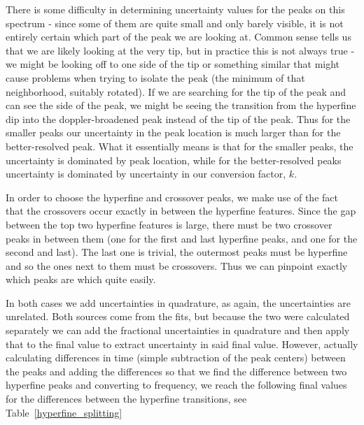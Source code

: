 \documentclass{article}
\begin{document}
  There is some difficulty in determining uncertainty values for the peaks on this spectrum - since some of them are quite small and only barely visible, it is not entirely certain which part of the peak we are looking at.  Common sense tells us that we are likely looking at the very tip, but in practice this is not always true - we might be looking off to one side of the tip or something similar that might cause problems when trying to isolate the peak (the minimum of that neighborhood, suitably rotated).  If we are searching for the tip of the peak and can see the side of the peak, we might be seeing the transition from the hyperfine dip into the doppler-broadened peak instead of the tip of the peak.  Thus for the smaller peaks our uncertainty in the peak location is much larger than for the better-resolved peak.  What it essentially means is that for the smaller peaks, the uncertainty is dominated by peak location, while for the better-resolved peaks uncertainty is dominated by uncertainty in our conversion factor, $k$.

  \hspace{.25cm}

  In order to choose the hyperfine and crossover peaks, we make use of the fact that the crossovers occur exactly in between the hyperfine features.  Since the gap between the top two hyperfine features is large, there must be two crossover peaks in between them (one for the first and last hyperfine peaks, and one for the second and last).  The last one is trivial, the outermost peaks must be hyperfine and so the ones next to them must be crossovers.  Thus we can pinpoint exactly which peaks are which quite easily.

  \hspace{.25cm}

  In both cases we add uncertainties in quadrature, as again, the uncertainties are unrelated.  Both sources come from the fits, but because the two were calculated separately we can add the fractional uncertainties in quadrature and then apply that to the final value to extract uncertainty in said final value.  However, actually calculating differences in time (simple subtraction of the peak centers) between the peaks and adding the differences so that we find the difference between two hyperfine peaks and converting to frequency, we reach the following final values for the differences between the hyperfine transitions, see Table~\ref{hyperfine_splitting}

  \hspace{.25cm}
\end{document}
